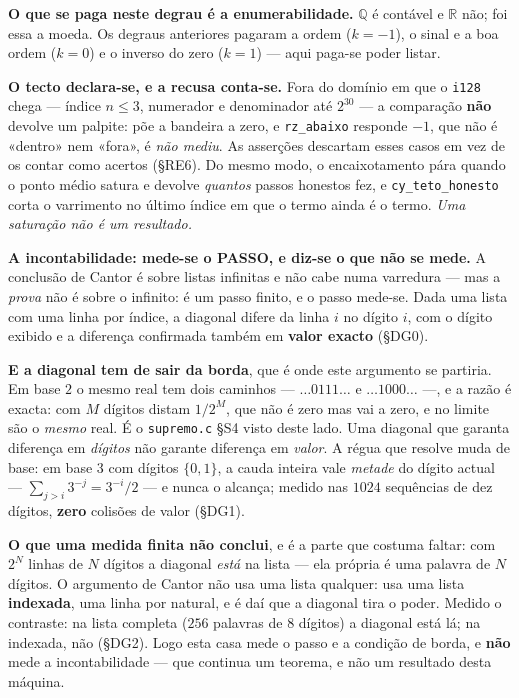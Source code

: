 \documentclass[11pt,a4paper]{article}
\newcommand{\code}[1]{\texttt{\small #1}}
\newcommand{\Q}{\mathbb{Q}}
\newcommand{\R}{\mathbb{R}}
\begin{document}
\noindent\textbf{O que se paga neste degrau é a enumerabilidade.} $\Q$ é
contável e $\R$ não; foi essa a moeda. Os degraus anteriores pagaram a ordem
($k=-1$), o sinal e a boa ordem ($k=0$) e o inverso do zero ($k=1$) --- aqui
paga-se poder listar.

\medskip\noindent\textbf{O tecto declara-se, e a recusa conta-se.} Fora do
domínio em que o \code{i128} chega --- índice $n\le3$, numerador e denominador
até $2^{30}$ --- a comparação \textbf{não} devolve um palpite: põe a bandeira a
zero, e \code{rz\_abaixo} responde $-1$, que não é «dentro» nem «fora», é
\emph{não mediu}. As asserções descartam esses casos em vez de os contar como
acertos (§RE6). Do mesmo modo, o encaixotamento pára quando o ponto médio satura
e devolve \emph{quantos} passos honestos fez, e \code{cy\_teto\_honesto} corta o
varrimento no último índice em que o termo ainda é o termo.
\emph{Uma saturação não é um resultado.}

\medskip\noindent\textbf{A incontabilidade: mede-se o PASSO, e diz-se o que não
se mede.} A conclusão de Cantor é sobre listas infinitas e não cabe numa
varredura --- mas a \emph{prova} não é sobre o infinito: é um passo finito, e o
passo mede-se. Dada uma lista com uma linha por índice, a diagonal difere da
linha $i$ no dígito $i$, com o dígito exibido e a diferença confirmada também em
\textbf{valor exacto} (§DG0).

\medskip\noindent\textbf{E a diagonal tem de sair da borda}, que é onde este
argumento se partiria. Em base $2$ o mesmo real tem dois caminhos ---
$\ldots0111\ldots$ e $\ldots1000\ldots$ ---, e a razão é exacta: com $M$ dígitos
distam $1/2^{M}$, que não é zero mas vai a zero, e no limite são o \emph{mesmo}
real. É o \code{supremo.c} §S4 visto deste lado. Uma diagonal que garanta
diferença em \emph{dígitos} não garante diferença em \emph{valor}. A régua que
resolve muda de base: em base $3$ com dígitos $\{0,1\}$, a cauda inteira vale
\emph{metade} do dígito actual --- $\sum_{j>i}3^{-j}=3^{-i}/2$ --- e nunca o
alcança; medido nas $1024$ sequências de dez dígitos, \textbf{zero} colisões de
valor (§DG1).

\medskip\noindent\textbf{O que uma medida finita não conclui}, e é a parte que
costuma faltar: com $2^{N}$ linhas de $N$ dígitos a diagonal \emph{está} na
lista --- ela própria é uma palavra de $N$ dígitos. O argumento de Cantor não
usa uma lista qualquer: usa uma lista \textbf{indexada}, uma linha por natural,
e é daí que a diagonal tira o poder. Medido o contraste: na lista completa
($256$ palavras de $8$ dígitos) a diagonal está lá; na indexada, não (§DG2).
Logo esta casa mede o passo e a condição de borda, e \textbf{não} mede a
incontabilidade --- que continua um teorema, e não um resultado desta máquina.
\end{document}
